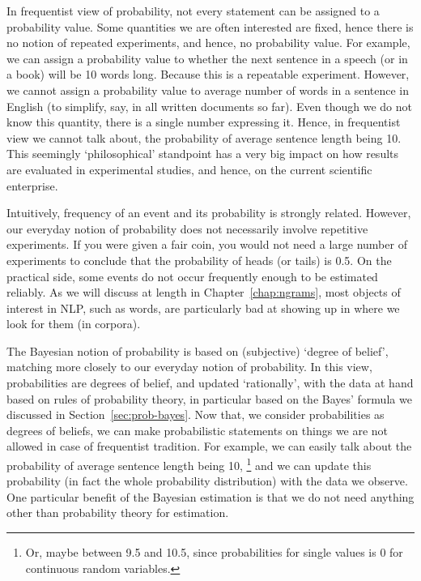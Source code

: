 In frequentist view of probability,
not every statement can be assigned to a probability value.
Some quantities we are often interested are fixed,
hence there is no notion of repeated experiments,
and hence, no probability value.
For example,
we can assign a probability value to
whether the next sentence in a speech (or in a book) will be
\num{10} words long.
Because this is a repeatable experiment.
However,
we cannot assign a probability value to average number of words
in a sentence in English (to simplify, say, in all written documents so far).
Even though we do not know this quantity,
there is a single number expressing it.
Hence, in frequentist view we cannot talk about,
the probability of average sentence length being \num{10}.
This seemingly `philosophical' standpoint has a very big impact
on how results are evaluated in experimental studies,
and hence, on the current scientific enterprise.

Intuitively,
frequency of an event and its probability is strongly related.
However,
our everyday notion of probability does
not necessarily involve repetitive experiments.
If you were given a fair coin,
you would not need a large number of experiments to conclude
that the probability of heads (or tails) is \num[round-precision=1]{0.5}.
On the practical side,
some events do not occur frequently enough to be estimated reliably.
As we will discuss at length in Chapter~\ref{chap:ngrams},
most objects of interest in NLP, such as words,
are particularly bad at showing up in where we look for them (in corpora).

The Bayesian notion of probability is based on (subjective)
`degree of belief',
matching more closely to our everyday notion of probability.
In this view,
probabilities are degrees of belief,
and updated `rationally',
with the data at hand based on rules of probability theory,
in particular based on the Bayes' formula we discussed in Section~\ref{sec:prob-bayes}.
Now that,
we consider probabilities as degrees of beliefs,
we can make probabilistic statements on things we are not allowed
in case of frequentist tradition.
For example,
we can easily talk about
the probability of average sentence length being \num{10},%
\footnote{Or, maybe between \num{9.5} and \num{10.5},
  since probabilities for single values is \num{0}
  for continuous random variables.}
and we can update this probability
(in fact the whole probability distribution) with the data we observe.
One particular benefit of the Bayesian estimation is that
we do not need anything other than probability theory for estimation.

